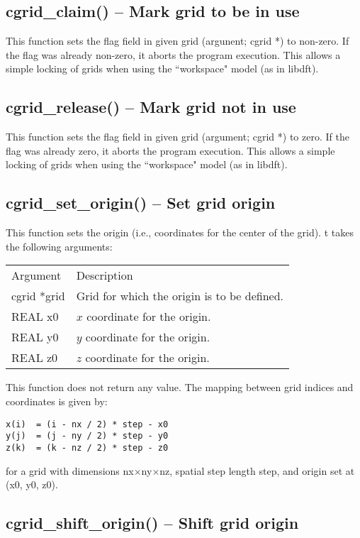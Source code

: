 \documentclass[12pt,letterpaper]{report}
\begin{document}
\subsection{cgrid\_claim() -- Mark grid to be in use}

This function sets the flag field in given grid (argunent; cgrid *) to non-zero. If the flag was already non-zero, it aborts the program execution. This allows a simple locking of grids when using the ``workspace" model (as in libdft).

\subsection{cgrid\_release() -- Mark grid not in use}

This function sets the flag field in given grid (argument; cgrid *) to zero. If the flag was already zero, it aborts the program execution. This allows a simple locking of grids when using the ``workspace" model (as in libdft).

\subsection{cgrid\_set\_origin() -- Set grid origin}

This function sets the origin (i.e., coordinates for the center of the grid). t takes the following arguments:
\begin{longtable}{p{} p{}}
Argument & Description\\
\cline{1-2}
cgrid *grid & Grid for which the origin is to be defined.\\
REAL x0 & $x$ coordinate for the origin.\\
REAL y0 & $y$ coordinate for the origin.\\
REAL z0 & $z$ coordinate for the origin.\\
\end{longtable}
\noindent
This function does not return any value. The mapping between grid indices and coordinates is given by:
\begin{verbatim}
x(i)  = (i - nx / 2) * step - x0
y(j)  = (j - ny / 2) * step - y0
z(k)  = (k - nz / 2) * step - z0
\end{verbatim}
for a grid with dimensions nx$\times$ny$\times$nz, spatial step length step, and origin set at (x0, y0, z0).

\subsection{cgrid\_shift\_origin() -- Shift grid origin}
\end{document}
